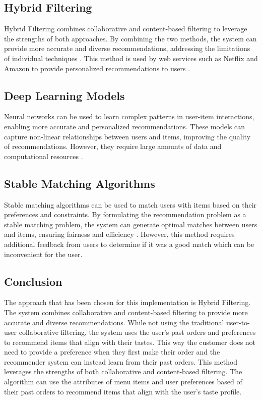 \subsection*{Hybrid Filtering}
Hybrid Filtering combines collaborative and content-based filtering to leverage the strengths of both approaches. By combining the two methods, the system can provide more accurate and diverse recommendations, addressing the limitations of individual techniques \cite{30}. This method is used by web services such as Netflix and Amazon to provide personalized recommendations to users \cite{33}.

\subsection*{Deep Learning Models}
Neural networks can be used to learn complex patterns in user-item interactions, enabling more accurate and personalized recommendations. These models can capture non-linear relationships between users and items, improving the quality of recommendations. However, they require large amounts of data and computational resources \cite{31}.

\subsection*{Stable Matching Algorithms}
Stable matching algorithms can be used to match users with items based on their preferences and constraints. By formulating the recommendation problem as a stable matching problem, the system can generate optimal matches between users and items, ensuring fairness and efficiency \cite{32}. However, this method requires additional feedback from users to determine if it was a good match which can be inconvenient for the user.

\subsection*{Conclusion}
The approach that has been chosen for this implementation is Hybrid Filtering. The system combines collaborative and content-based filtering to provide more accurate and diverse recommendations. While not using the traditional user-to-user collaborative filtering, the system uses the user's past orders and preferences to recommend items that align with their tastes. This way the customer does not need to provide a preference when they first make their order and the recommender system can instead learn from their past orders. This method leverages the strengths of both collaborative and content-based filtering. The algorithm can use the attributes of menu items and user preferences based of their past orders to recommend items that align with the user's taste profile.


